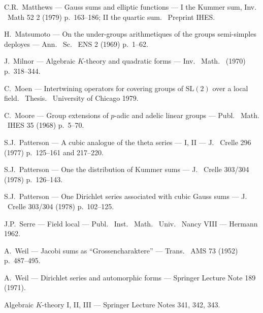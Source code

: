 \documentclass[12pt,a4paper]{article}
\theoremstyle{plain}
\theoremstyle{definition}
\theoremstyle{remark}
\begin{document}
\begin{enumerate}[label={[\arabic*]}]
\item C.R.\ Matthews --- Gauss sums and elliptic functions --- I the Kummer sum, Inv.
\ Math 52 2 (1979) p.\ 163--186; II the quartic sum.
\ Preprint IHES.

\item H.\ Matsumoto --- On the under-groups arithmetiques of the groups semi-simples deployes --- Ann.
\ Sc.
\ ENS 2 (1969) p.\ 1--62.

\item J.\ Milnor --- Algebraic $K$-theory and quadratic forms --- Inv.
\ Math.
\ (1970) p.\ 318--344.

\item C.\ Moen --- Intertwining operators for covering groups of $\mathrm{SL}(2)$ over a local field.
\ Thesis.
\ University of Chicago 1979.

\item C.\ Moore --- Group extensions of $p$-adic and adelic linear groups --- Publ.
\ Math.
\ IHES 35 (1968) p.\ 5--70.

\item S.J.\ Patterson --- A cubic analogue of the theta series --- I, II --- J.
\ Crelle 296 (1977) p.\ 125--161 and 217--220.

\item S.J.\ Patterson --- One the distribution of Kummer sums --- J.
\ Crelle 303/304 (1978) p.\ 126--143.

\item S.J.\ Patterson --- One Dirichlet series associated with cubic Gauss sums --- J.
\ Crelle 303/304 (1978) p.\ 102--125.

\item J.P.\ Serre --- Field local --- Publ.
\ Inst.
\ Math.
\ Univ.
\ Nancy VIII --- Hermann 1962.

\item A.\ Weil --- Jacobi sums as ``Grossencharaktere'' --- Trans.
\ AMS 73 (1952) p.\ 487--495.

\item A.\ Weil --- Dirichlet series and automorphic forms --- Springer Lecture Note 189 (1971).

\item Algebraic $K$-theory I, II, III --- Springer Lecture Notes 341, 342, 343.
\end{enumerate}
\end{document}
